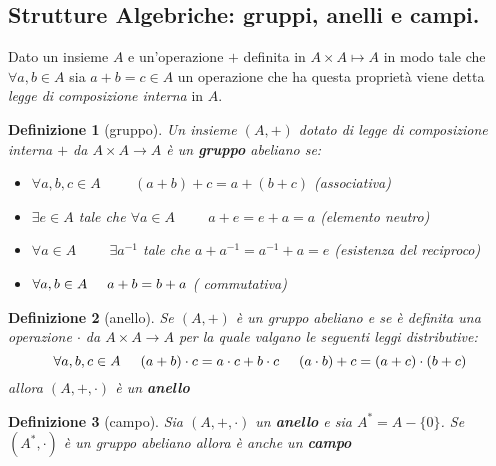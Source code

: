 \documentclass[14pt,a4paper]{article}
\newtheorem{definition}{Definizione}[section]
\begin{document}
	\subsection{Strutture Algebriche:  gruppi, anelli e campi.}
	Dato un insieme $ A$ e un'operazione $ + $ definita in $ A\times A\longmapsto A $ in modo tale che $ \forall a,b \in A $ sia $ a + b=c \in A $ un operazione che ha questa proprietà viene detta \textit{legge di composizione interna} in $ A $.\\
	\begin{definition}[gruppo]
		Un insieme $ (A,+) $ dotato di legge di composizione interna $ + $ da $ A\times A\longrightarrow A $   è un \textbf{gruppo} abeliano se:
		\begin{itemize}
			\item $ \forall a,b,c\in A \hspace{1cm} (a + b)+ c=a + (b  + c) $ (associativa)
			\item  $\exists e \in A $ tale che  $ \forall a \in A \hspace{1cm} a  + e=e  + a=a$ (elemento neutro)
			\item $ \forall a \in A \hspace{1cm} \exists a^{-1}$ tale che $ a + a^{-1} = a^{-1} + a=e$ (esistenza del reciproco) 
			\item $\forall a,b \in A \hspace{0.5 cm} a+b=b+a $ ( commutativa)
		\end{itemize}
	\end{definition}
	
	 \begin{definition}[anello]
	 	Se $ (A,+) $ è un gruppo abeliano e se è definita una operazione $ \cdot $ da $ A\times A\longrightarrow A $ per la quale valgano le seguenti leggi distributive:
	 	\[ \forall a,b,c \in A \hspace{.5cm}(a+b)\cdot c=a\cdot c+ b\cdot c \hspace{.5cm} (a\cdot b)+c=(a+c)\cdot (b+c)\] allora $ (A,+,\cdot) $ è un \textbf{anello} 
	 \end{definition}
	\begin{definition}[campo]
		Sia $ (A,+,\cdot) $ un \textbf{anello} e sia $ A^*=A-\{0\} $. Se $ (A^*,\cdot) $   è un gruppo abeliano allora è anche un \textbf{campo}\\
	\end{definition}
\end{document}
